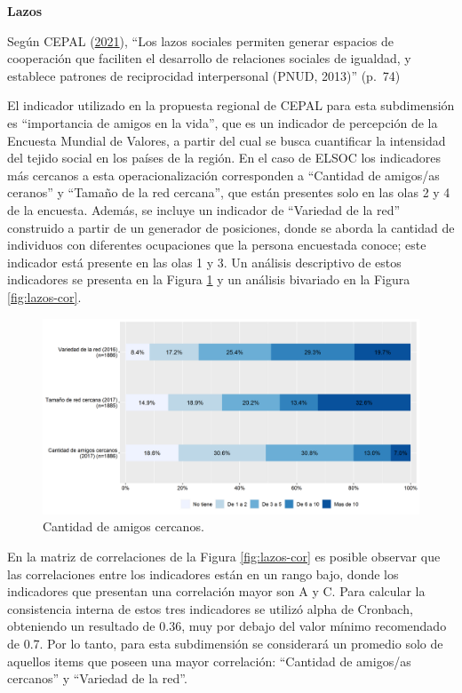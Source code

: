 \documentclass[
  12pt,
]{book}
\begin{document}
\textbf{Lazos}

Según CEPAL (\protect\hyperlink{ref-cepal_Cohesion_2021}{2021}), ``Los lazos sociales permiten generar espacios de cooperación que faciliten el desarrollo de relaciones sociales de igualdad, y establece patrones de reciprocidad interpersonal (PNUD, 2013)'' (p.~74)

El indicador utilizado en la propuesta regional de CEPAL para esta subdimensión es ``importancia de amigos en la vida'', que es un indicador de percepción de la Encuesta Mundial de Valores, a partir del cual se busca cuantificar la intensidad del tejido social en los países de la región. En el caso de ELSOC los indicadores más cercanos a esta operacionalización corresponden a ``Cantidad de amigos/as ceranos'' y ``Tamaño de la red cercana'', que están presentes solo en las olas 2 y 4 de la encuesta. Además, se incluye un indicador de ``Variedad de la red'' construido a partir de un generador de posiciones, donde se aborda la cantidad de individuos con diferentes ocupaciones que la persona encuestada conoce; este indicador está presente en las olas 1 y 3. Un análisis descriptivo de estos indicadores se presenta en la Figura \ref{fig:lazos} y un análisis bivariado en la Figura \ref{fig:lazos-cor}.

\begin{figure}[H]

{\centering \includegraphics[width=1\linewidth,height=1\textheight]{output/graphs/lazos} 

}

\caption{Cantidad de amigos cercanos.}\label{fig:lazos}
\end{figure}

En la matriz de correlaciones de la Figura \ref{fig:lazos-cor} es posible observar que las correlaciones entre los indicadores están en un rango bajo, donde los indicadores que presentan una correlación mayor son A y C. Para calcular la consistencia interna de estos tres indicadores se utilizó alpha de Cronbach, obteniendo un resultado de 0.36, muy por debajo del valor mínimo recomendado de 0.7. Por lo tanto, para esta subdimensión se considerará un promedio solo de aquellos items que poseen una mayor correlación: ``Cantidad de amigos/as cercanos'' y ``Variedad de la red''.
\end{document}

